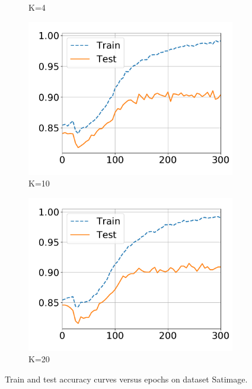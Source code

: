 \begin{figure}[!t]
\begin{subfigure}{0.31\textwidth}
    \caption{K=4}
  \end{subfigure}
  \centering
  \begin{subfigure}{.31\textwidth}
    \centering
    \includegraphics[width=1\linewidth]{images/supply/train_curves/satimage_10.pdf}
    \vspace{-0.8cm}
    \caption{K=10}
  \end{subfigure}
  \centering
  \begin{subfigure}{.31\textwidth}
    \centering
    \includegraphics[width=1\linewidth]{images/supply/train_curves/satimage_20.pdf}
    \vspace{-0.8cm}
    \caption{K=20}
  \end{subfigure}
  \caption{Train and test accuracy curves versus epochs on dataset Satimage.}
  \label{fig:class-satimage}
\end{figure}

